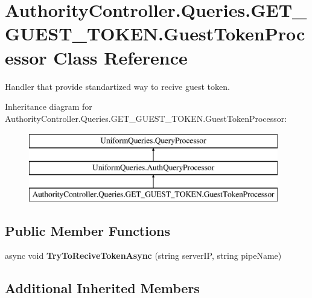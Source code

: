\hypertarget{class_authority_controller_1_1_queries_1_1_g_e_t___g_u_e_s_t___t_o_k_e_n_1_1_guest_token_processor}{}\section{Authority\+Controller.\+Queries.\+G\+E\+T\+\_\+\+G\+U\+E\+S\+T\+\_\+\+T\+O\+K\+E\+N.\+Guest\+Token\+Processor Class Reference}
\label{class_authority_controller_1_1_queries_1_1_g_e_t___g_u_e_s_t___t_o_k_e_n_1_1_guest_token_processor}


Handler that provide standartized way to recive guest token.  


Inheritance diagram for Authority\+Controller.\+Queries.\+G\+E\+T\+\_\+\+G\+U\+E\+S\+T\+\_\+\+T\+O\+K\+E\+N.\+Guest\+Token\+Processor\+:\begin{figure}[H]
\begin{center}
\leavevmode
\includegraphics[height=3.000000cm]{d3/d12/class_authority_controller_1_1_queries_1_1_g_e_t___g_u_e_s_t___t_o_k_e_n_1_1_guest_token_processor}
\end{center}
\end{figure}
\subsection*{Public Member Functions}
\begin{DoxyCompactItemize}
\item 
\mbox{\label{class_authority_controller_1_1_queries_1_1_g_e_t___g_u_e_s_t___t_o_k_e_n_1_1_guest_token_processor_a3ea66cf6e89ad9e48edfaf0d9509a4b3}} 
async void {\bfseries Try\+To\+Recive\+Token\+Async} (string server\+IP, string pipe\+Name)
\end{DoxyCompactItemize}
\subsection*{Additional Inherited Members}



